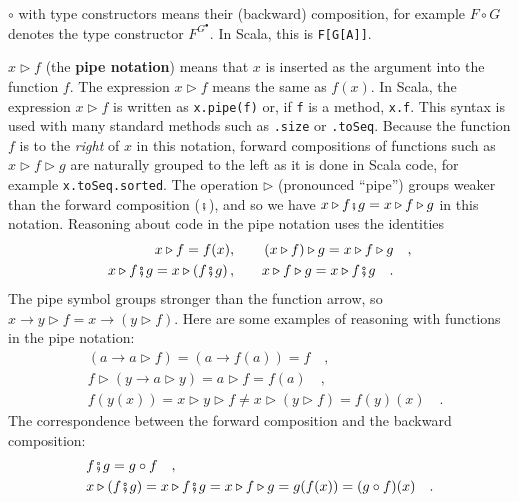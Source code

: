 $\circ$ with type constructors means their (backward) composition,
for example $F\circ G$ denotes the type constructor $F^{G^{\bullet}}$.
In Scala, this is \lstinline!F[G[A]]!. 

$x\triangleright f$ (the \textbf{pipe notation})
means that $x$ is inserted as the argument into the function $f$.
The expression $x\triangleright f$ means the same as $f(x)$. In
Scala, the expression $x\triangleright f$ is written as \lstinline!x.pipe(f)!
or, if \lstinline!f! is a method, \lstinline!x.f!. This syntax is
used with many standard methods such as \lstinline!.size! or \lstinline!.toSeq!.
Because the function $f$ is to the \emph{right} of $x$ in this notation,
forward compositions of functions such as $x\triangleright f\triangleright g$
are naturally grouped to the left as it is done in Scala code, for
example \lstinline!x.toSeq.sorted!. The operation $\triangleright$
(pronounced \textsf{``}pipe\textsf{''}) groups weaker than the forward composition
($\bef$), and so we have $x\triangleright f\bef g=x\triangleright f\triangleright g$
in this notation. Reasoning about code in the pipe notation uses the
identities
\begin{align*}
x\triangleright f=f(x),\quad\quad & \left(x\triangleright f\right)\triangleright g=x\triangleright f\triangleright g\quad,\\
x\triangleright f\bef g=x\triangleright\left(f\bef g\right),\quad\quad & x\triangleright f\triangleright g=x\triangleright f\bef g\quad.
\end{align*}
The pipe symbol groups stronger than the function arrow, so $x\rightarrow y\triangleright f=x\rightarrow(y\triangleright f)$.
Here are some examples of reasoning with functions in the pipe notation:
\begin{align*}
 & \left(a\rightarrow a\triangleright f\right)=\left(a\rightarrow f(a)\right)=f\quad,\\
 & f\triangleright\left(y\rightarrow a\triangleright y\right)=a\triangleright f=f(a)\quad,\\
 & f(y(x))=x\triangleright y\triangleright f\neq x\triangleright\left(y\triangleright f\right)=f(y)(x)\quad.
\end{align*}
The correspondence between the forward composition and the backward
composition:
\begin{align*}
 & f\bef g=g\circ f\quad,\\
 & x\triangleright(f\bef g)=x\triangleright f\bef g=x\triangleright f\triangleright g=g(f(x))=(g\circ f)(x)\quad.
\end{align*}

